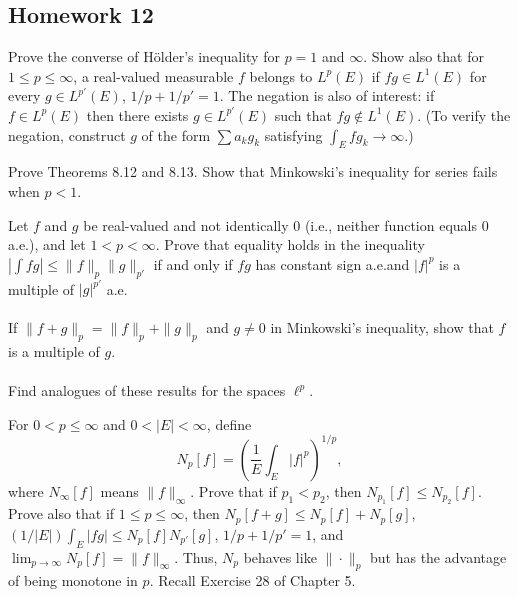 \subsection{Homework 12}
\begin{problem}
  Prove the converse of Hölder's inequality for $p=1$ and $\infty$. Show
  also that for $1\leq p\leq\infty$, a real-valued measurable $f$ belongs
  to $L^p(E)$ if $fg\in L^1(E)$ for every $g\in L^{p'}(E)$,
  $1/p+1/p'=1$. The negation is also of interest: if $f\in L^p(E)$ then
  there exists $g\in L^{p'}(E)$ such that $fg\notin L^1(E)$. (To verify the
  negation, construct $g$ of the form $\sum a_kg_k$ satisfying
  $\int_E fg_k\to\infty$.)
\end{problem}
\begin{solution}
\end{solution}

\begin{problem}
  Prove Theorems 8.12 and 8.13. Show that Minkowski’s inequality for series
  fails when $p<1$.
\end{problem}
\begin{solution}
\end{solution}

\begin{problem}
  Let $f$ and $g$ be real-valued and not identically $0$ (i.e., neither
  function equals $0$ a.e.), and let $1<p<\infty$. Prove that equality
  holds in the inequality $|\int fg|\leq\|f\|_p\|g\|_{p'}$ if and only if
  $fg$ has constant sign a.e.\@ and $|f|^p$ is a multiple of $|g|^{p'}$
  a.e.
  \\\\
  If $\|f+g\|_p=\|f\|_p+\|g\|_{p}$ and $g\neq 0$ in Minkowski's inequality,
  show that $f$ is a multiple of $g$.
  \\\\
  Find analogues of these results for the spaces $\ell^p$.
\end{problem}
\begin{solution}
\end{solution}

\begin{problem}
  For $0<p\leq\infty$ and $0<|E|<\infty$, define
  \[
    N_p[f]=\left(\frac{1}{E}\int_E|f|^p\right)^{1/p},
  \]
  where $N_\infty[f]$ means $\|f\|_\infty$. Prove that if $p_1<p_2$, then
  $N_{p_1}[f]\leq N_{p_2}[f]$. Prove also that if $1\leq p\leq \infty$,
  then $N_p[f+g]\leq N_p[f]+N_p[g]$,
  $(1/|E|)\int_E|fg|\leq N_p[f]N_{p'}[g]$, $1/p+1/p'=1$, and
  $\lim_{p\to\infty} N_p[f]=\|f\|_\infty$. Thus, $N_p$ behaves like
  $\|\cdot\|_p$ but has the advantage of being monotone in $p$. Recall
  Exercise 28 of Chapter 5.
\end{problem}
\begin{solution}
\end{solution}

